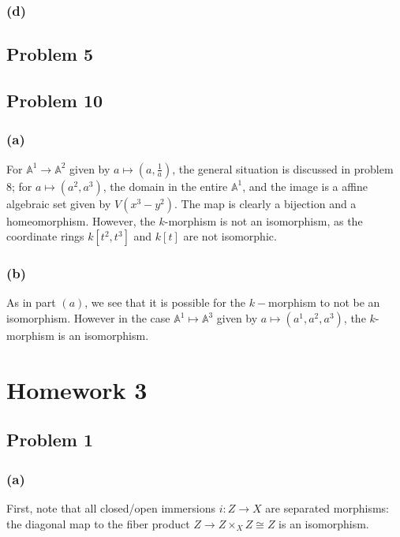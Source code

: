 \documentclass{article}
\theoremstyle{definition}
\theoremstyle{definition}
\theoremstyle{definition}
\theoremstyle{definition}
\theoremstyle{definition}
\theoremstyle{definition}
\theoremstyle{definition}
\begin{document}
\subsubsection*{(d)}

\subsection*{Problem 5}




\subsection*{Problem 10}
\subsubsection*{(a)}
For $\mathbb{A}^1\to \mathbb{A}^2$ given by $a\mapsto (a,\frac{1}{a})$, the general situation is discussed in problem 8; for $a\mapsto (a^2,a^3)$, the domain in the entire $\mathbb{A}^1$, and the image is a affine algebraic set given by $V(x^3-y^2)$. The map is clearly a bijection and a homeomorphism. However, the $k$-morphism is not an isomorphism, as the coordinate rings $k[t^2,t^3]$ and $k[t]$ are not isomorphic.
\subsubsection*{(b)}
As in part $(a)$, we see that it is possible for the $k-$morphism to not be an isomorphism. However in the case $\mathbb{A}^1\mapsto \mathbb{A}^3$ given by $a\mapsto (a^1,a^2,a^3)$, the $k$-morphism is an isomorphism. 


\section*{Homework 3}
\subsection*{Problem 1}
\subsubsection*{(a)}
First, note that all closed/open immersions $i: Z\to X$ are separated morphisms: the diagonal map to the fiber product $Z\to Z\times_X Z\cong Z$ is an isomorphism. 
\end{document}
